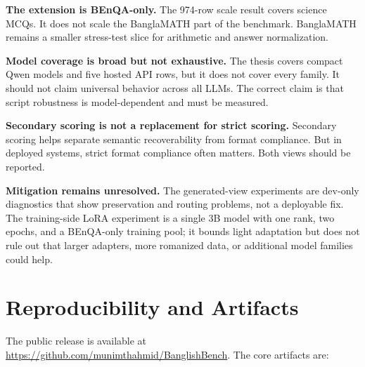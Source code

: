 \textbf{The extension is BEnQA-only.} The 974-row scale result covers science MCQs. It does not scale the BanglaMATH part of the benchmark. BanglaMATH remains a smaller stress-test slice for arithmetic and answer normalization.

\textbf{Model coverage is broad but not exhaustive.} The thesis covers compact Qwen models and five hosted API rows, but it does not cover every family. It should not claim universal behavior across all LLMs. The correct claim is that script robustness is model-dependent and must be measured.

\textbf{Secondary scoring is not a replacement for strict scoring.} Secondary scoring helps separate semantic recoverability from format compliance. But in deployed systems, strict format compliance often matters. Both views should be reported.

\textbf{Mitigation remains unresolved.} The generated-view experiments are dev-only diagnostics that show preservation and routing problems, not a deployable fix. The training-side LoRA experiment is a single 3B model with one rank, two epochs, and a BEnQA-only training pool; it bounds light adaptation but does not rule out that larger adapters, more romanized data, or additional model families could help.

\section{Reproducibility and Artifacts}

The public release is available at \url{https://github.com/munimthahmid/BanglishBench}. The core artifacts are:

